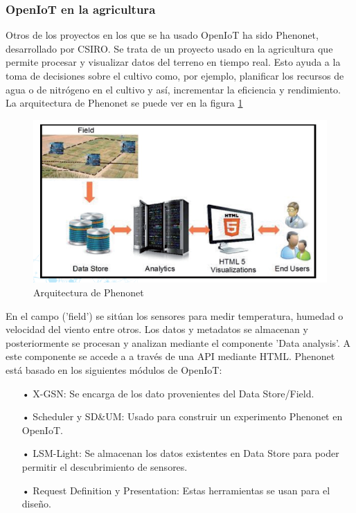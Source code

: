 \documentclass[12pt, twoside]{book}
\begin{document}
\subsubsection{OpenIoT en la agricultura}
Otros de los proyectos en los que se ha usado OpenIoT ha sido Phenonet, desarrollado por CSIRO. Se trata de un proyecto usado en la agricultura que permite procesar y visualizar datos del terreno en tiempo real. Esto ayuda a la toma de decisiones sobre el cultivo como, por ejemplo, planificar los recursos de agua o de nitrógeno en el cultivo y así, incrementar la eficiencia y rendimiento. La arquitectura de Phenonet se puede ver en la figura \ref{L411}
\begin{figure}[H]
\centering
\includegraphics[scale=0.4]{images/phenonet_capture}
\caption{Arquitectura de Phenonet}\label{L411}
\end{figure}

En el campo ('field') se sitúan los sensores para medir temperatura, humedad o velocidad del viento entre otros. Los datos y metadatos se almacenan y posteriormente se procesan y analizan mediante el componente 'Data analysis'. A este componente se accede a a través de una API mediante HTML. Phenonet está basado en los siguientes módulos de OpenIoT:
\begin{itemize}
\item[•] X-GSN: Se encarga de los dato provenientes del Data Store/Field.
\item[•] Scheduler y SD\&UM: Usado para construir un experimento Phenonet en OpenIoT.
\item[•] LSM-Light: Se almacenan los datos existentes en Data Store para poder permitir el descubrimiento de sensores.
\item[•] Request Definition y Presentation: Estas herramientas se usan para el diseño. 
\end{itemize}
\end{document}
